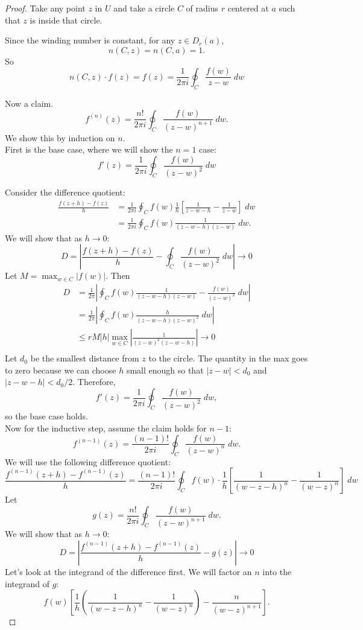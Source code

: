 \begin{proof}
    Take any point $z$ in $U$ and take a circle $C$ of radius $r$ centered at $a$
    such that $z$ is inside that circle.
    
    Since the winding number is constant, for any $z \in D_r (a)$,
    \[ n(C, z) = n(C, a) = 1. \]
    So
    \[ n(C,z) \cdot f(z) = f(z) = \frac{1}{2\pi i} 
    \oint_{C} \frac{f(w)}{z-w} \; dw \]

    Now a claim.
    \[ f^{(n)} (z) = \frac{n!}{2\pi i} \oint_{C} \frac{f(w)}{(z-w)^{n+1}} \; dw. \]
    We show this by induction on $n$. \\

    First is the base case, where we will show the $n=1$ case:
    \[ f'(z) = \frac{1}{2 \pi i} \oint_C \frac{f(w)}{(z-w)^2} \; dw \]

    Consider the difference quotient:
    \begin{align*}
        \frac{f(z+h) - f(z)}{h} &= 
    \frac{1}{2\pi i} \oint_C f(w) \frac{1}{h} \left[ \frac{1}{z-w-h} - \frac{1}{z-w} \right] \; dw \\
        &= \frac{1}{2\pi i} \oint_C f(w) \frac{1}{(z-w-h)(z-w)} \; dw.
    \end{align*}
    We will show that as $h \to 0$:
    \[D = \left| \frac{f(z+h) - f(z)}{h} -\oint_C \frac{f(w)}{(z-w)^2} \; dw \right| \to 0\]
    Let $M = \max_{w \in C} |f(w)|$. Then
    \begin{align*}
        D &= \frac{1}{2\pi} \left| \oint_C f(w) \frac{1}{(z-w-h)(z-w)} - \frac{f(w)}{(z-w)^2} \; dw \right| \\
        &= \frac{1}{2\pi} \left| \oint_C f(w) \frac{h}{(z-w-h)(z-w)^2} \; dw \right| \\
        &\le rM |h| \max_{w \in C} \left| \frac{1}{(z-w)^2(z-w-h)} \right| \to 0 \tag{ML Theorem} \\
    \end{align*}
    Let $d_0$ be the smallest distance from $z$ to the circle.
    The quantity in the max goes to zero because we can choose $h$ small enough so that $|z-w| < d_0$ and $|z-w-h| < d_0/2$.
    Therefore,
    \[ f'(z) = \frac{1}{2 \pi i} \oint_C \frac{f(w)}{(z-w)^2} \; dw, \]
    so the base case holds. \\

    Now for the inductive step, assume the claim holds for $n-1$:
    \[ f^{(n-1)} (z) = \frac{(n-1)!}{2\pi i} 
    \oint_C \frac{f(w)}{(z-w)^n} \; dw. \]
    We will use the following difference quotient:
    \[ \frac{f^{(n-1)}(z+h) - f^{(n-1)}(z)}{h} = 
        \frac{(n-1)!}{2\pi i} \oint_C f(w) \cdot \frac{1}{h}
    \left[ \frac{1}{(w-z-h)^n} - \frac{1}{(w-z)^n} \right] \; dw \]
    Let 
    \[g(z) = \frac{n!}{2\pi i}\oint_C \frac{f(w)}{(z-w)^{n+1}} \; dw. \]
    We will show that as $h \to 0$:
    \[ D = \left| \frac{f^{(n-1)}(z+h) - f^{(n-1)}(z)}{h} - g(z)
    \right| \to 0 \]
    Let's look at the integrand of the difference first.
    We will factor an $n$ into the integrand of $g$:
    \[ f(w) \left[ \frac{1}{h} \left( \frac{1}{(w-z-h)^n} - \frac{1}{(w-z)^n}\right) - \frac{n}{(w-z)^{n+1}} \right]. \]


\end{proof}
